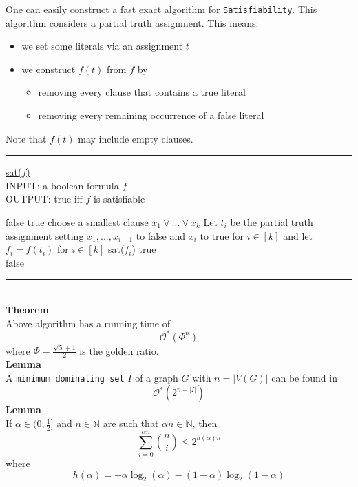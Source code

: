\documentclass[a4paper, 12pt]{article}
\begin{document}
	One can easily construct a fast exact algorithm for \texttt{Satisfiability}. This algorithm considers a partial truth assignment. This means:
	\begin{itemize}
		\item we set some literals via an assignment $t$
		\item we construct $f(t)$ from $f$ by \begin{itemize}
			\item removing every clause that contains a true literal
			\item removing every remaining occurrence of a false literal
		\end{itemize}
	\end{itemize}
	Note that $f(t)$ may include empty clauses.
	\par\noindent\rule{\textwidth}{0.4pt}
	\underline{sat($f$)}\\
	INPUT: a boolean formula $f$\\
	OUTPUT: true iff $f$ is satisfiable
	\begin{algorithmic}[1]
		\Return false
		\EndIf
		\Return true
		\EndIf
		\State choose a smallest clause $x_1 \lor ... \lor x_k$
		\State Let $t_i$ be the partial truth assignment setting $x_1,...,x_{i-1}$ to false and $x_i$ to true for $i \in [k]$ and let $f_i = f(t_i)$ for $i \in [k]$
		\Return sat($f_i$)
		\Else
			\Return true
			\Else\\
			\indent\indent\indent\Return false
			\EndIf
		\EndIf 
	\end{algorithmic}
	\par\noindent\rule{\textwidth}{0.4pt}\\
	\textbf{Theorem}\\
	Above algorithm has a running time of \[\mathcal{O}^*(\Phi^n)\]
	where $\Phi = \frac{\sqrt{5}+1}{2}$ is the golden ratio.\\
	\textbf{Lemma}\\
	A \texttt{minimum dominating set} $I$ of a graph $G$ with $n = \left|V(G)\right|$ can be found in \[\mathcal{O}^*(2^{n-\left|I\right|})\]
	\textbf{Lemma}\\
	If $\alpha \in (0, \frac{1}{2}]$ and $n \in \mathbb{N}$ are such that $\alpha n \in \mathbb{N}$, then \[\sum_{i=0}^{\alpha n} \binom{n}{i} \leq 2^{h(\alpha)n}\] where \[h(\alpha) = -\alpha \log_2(\alpha) - (1-\alpha)\log_2(1-\alpha)\]
\end{document}
